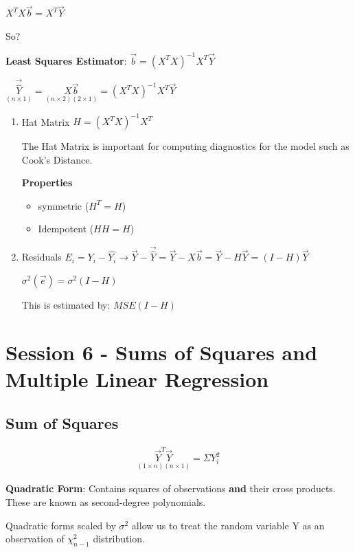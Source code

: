 \documentclass[11pt]{article}
\begin{document}
\(X^T X \vec{b} = X^T \vec{Y}\)

So?

\textbf{Least Squares Estimator}: \(\vec{b} = (X^T X)^{-1} X^T \vec{Y}\)

\(\underset{(n \times 1)}{\vec{\hat{Y}}} = \underset{(n \times 2)(2 \times
1)}{X \vec{b}} = (X^T X)^{-1} X^T \vec{Y}\)

\begin{enumerate}
\item Hat Matrix
\label{sec:org6d76b91}
\(H = (X^T X)^{-1} X^T\)

The Hat Matrix is important for computing diagnostics for the model such as
Cook's Distance.

\textbf{Properties}
\begin{itemize}
\item symmetric (\(H^T = H\))
\item Idempotent (\(HH = H\))
\end{itemize}

\item Residuals
\label{sec:org66fcae4}
\(E_i = Y_i - \hat{Y_i} \to \vec{Y} - \vec{\hat{Y}} = \vec{Y} - X \vec{b} =
\vec{Y} - H \vec{Y} = (I - H) \vec{Y}\)

\(\sigma^2(\vec{e}) = \sigma^2(I - H)\)

This is estimated by: \(MSE (I - H)\)
\end{enumerate}
\section{Session 6 - Sums of Squares and Multiple Linear Regression}
\label{sec:org6687ba9}

\subsection{Sum of Squares}
\label{sec:orgc2cbfd5}

\begin{equation}
\begin{split}
\underset{(1 \times n)(n \times 1)}{\vec{Y}^T \vec{Y}} = \Sigma Y_i^2
\end{split}
\end{equation}

\textbf{Quadratic Form}: Contains squares of observations \textbf{and} their cross products.
 These are known as second-degree polynomials.

Quadratic forms scaled by \(\sigma^2\) allow us to treat the random variable Y as
an observation of \(\chi^2_{n - 1}\) distribution.
\end{document}
